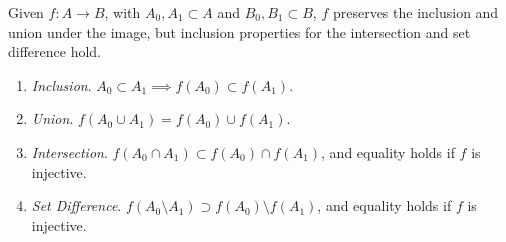 \documentclass{article}
\begin{document}
    \begin{theorem}
      Given $f: A \rightarrow B$, with $A_0, A_1 \subset A$ and $B_0, B_1 \subset B$, $f$ preserves the inclusion and union under the image, but inclusion properties for the intersection and set difference hold. 
      \begin{enumerate}
        \item \textit{Inclusion}. $A_0 \subset A_1 \implies f(A_0) \subset f(A_1)$. 
        \item \textit{Union}. $f(A_0 \cup A_1) = f(A_0) \cup f(A_1)$. 
        \item \textit{Intersection}. $f(A_0 \cap A_1) \subset f(A_0) \cap f (A_1)$, and equality holds if $f$ is injective. 
        \item \textit{Set Difference}. $f(A_0 \setminus A_1) \supset f(A_0) \setminus f(A_1)$, and equality holds if $f$ is injective. 
      \end{enumerate}
    \end{theorem} 
\end{document}
